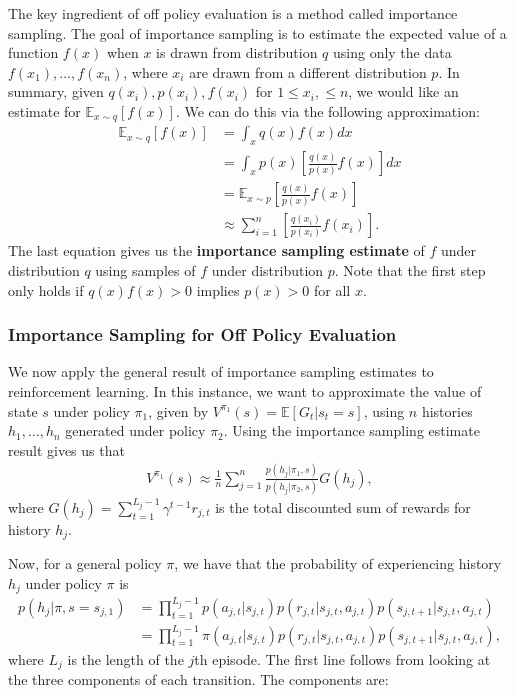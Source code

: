 \documentclass{article}
\newcommand{\E}{\mathbb{E}}                                        %
\begin{document}
The key ingredient of off policy evaluation is a method called importance sampling.  The goal of importance sampling is to estimate the expected value of a function $f(x)$ when $x$ is drawn from distribution $q$ using only the data $f(x_1), \ldots, f(x_n)$, where $x_i$ are drawn from a different distribution $p$.  In summary, given $q(x_i), p(x_i), f(x_i)$ for $1 \leq x_i, \leq n$, we would like an estimate for $\E_{x \sim q}[f(x)]$.  We can do this via the following approximation:
\begin{align}
\E_{x \sim q}[f(x)] &= \int_x q(x)f(x) dx \\
&= \int_x p(x) \left[ \frac{q(x)}{p(x)} f(x) \right] dx \\
&= \E_{x \sim p} \left[ \frac{q(x)}{p(x)} f(x) \right] \\
&\approx \sum_{i = 1}^n \left[ \frac{q(x_i)}{p(x_i)} f(x_i) \right].
\end{align}
The last equation gives us the \textbf{importance sampling estimate} of $f$ under distribution $q$ using samples of $f$ under distribution $p$.  Note that the first step only holds if $q(x)f(x) > 0$ implies $p(x) > 0$ for all $x$.


\subsubsection{Importance Sampling for Off Policy Evaluation}

We now apply the general result of importance sampling estimates to reinforcement learning.  In this instance, we want to approximate the value of state $s$ under policy $\pi_1$, given by $V^{\pi_1}(s) = \E[G_t | s_t = s]$, using $n$ histories $h_1, \ldots, h_n$ generated under policy $\pi_2$.  Using the importance sampling estimate result gives us that
\begin{align}
V^{\pi_1}(s) \approx \frac{1}{n} \sum_{j = 1}^n \frac{p(h_j | \pi_1, s)}{p(h_j | \pi_2, s)} G(h_j),
\end{align}
where $G(h_j) = \sum_{t =1}^{L_j - 1} \gamma^{t-1} r_{j, t}$ is the total discounted sum of rewards for history $h_j$.

Now, for a general policy $\pi$, we have that the probability of experiencing history $h_j$ under policy $\pi$ is
\begin{align}
p(h_j | \pi, s=s_{j,1}) &= \prod_{t = 1}^{L_j - 1} p(a_{j,t} | s_{j,t}) p(r_{j,t} | s_{j,t}, a_{j,t}) p(s_{j, t+1} | s_{j,t}, a_{j,t}) \\
&= \prod_{t = 1}^{L_j - 1} \pi(a_{j,t} | s_{j,t}) p(r_{j,t} | s_{j,t}, a_{j,t}) p(s_{j, t+1} | s_{j,t}, a_{j,t}),
\end{align}
where $L_j$ is the length of the $j$th episode.  The first line follows from looking at the three components of each transition.  The components are:
\end{document}
